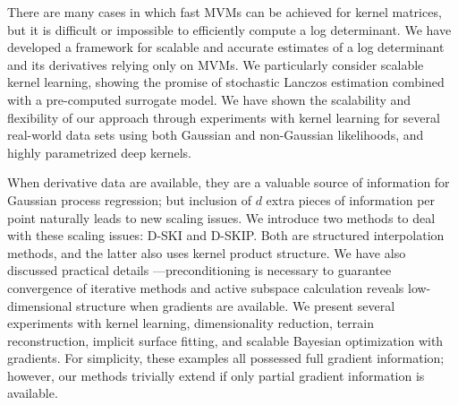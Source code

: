 There are many cases in which fast MVMs can be achieved for kernel matrices, but
it is difficult or impossible to efficiently compute a log determinant. We have
developed a framework for scalable and accurate estimates of a log determinant
and its derivatives relying only on MVMs. We particularly consider scalable
kernel learning, showing the promise of stochastic Lanczos estimation combined
with a pre\hyp{}computed surrogate model. We have shown the scalability and
flexibility of our approach through experiments with kernel learning for several
real\hyp{}world data sets using both Gaussian and non\hyp{}Gaussian likelihoods,
and highly parametrized deep kernels.

When derivative data are available, they are a valuable source of
information for Gaussian process regression; but inclusion of $d$ extra pieces
of information per point naturally leads to new scaling issues. We introduce two
methods to deal with these scaling issues: D-SKI and D-SKIP. Both are structured
interpolation methods, and the latter also uses kernel product structure. We
have also discussed practical details ---preconditioning is necessary to
guarantee convergence of iterative methods and active subspace calculation
reveals low-dimensional structure when gradients are available. We present
several experiments with kernel learning, dimensionality reduction, terrain
reconstruction, implicit surface fitting, and scalable Bayesian optimization
with gradients. For simplicity, these examples all possessed full gradient
information; however, our methods trivially extend if only partial gradient
information is available.